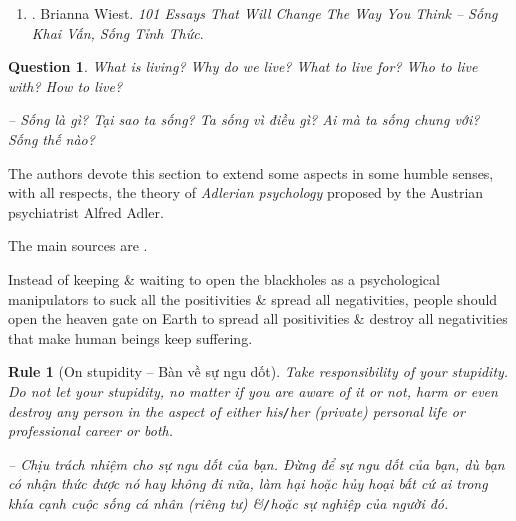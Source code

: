 \documentclass[12pt]{article}
\newtheorem{question}{Question}
\newtheorem{Rule}{Rule}
\begin{document}
\begin{enumerate}
\begin{quotation}
		-- Hoàn thành các mục tiêu không phải là thành công. Mà việc bạn mở rộng bao nhiêu trong quá trình này mới là thành công.
		
		{\it``Your habits create your mood, \& your mood is a filter through which you experience your life.''}
		
		-- Thói quen của bạn tạo ra tâm trạng của bạn, \& tâm trạng của bạn là một bộ lọc để bạn trải nghiệm cuộc sống của mình.
		
		{\it``You must learn to let your conscious decisions dictate your day -- not your fears or impulses.''}
		
		-- Bạn phải học cách để những quyết định có ý thức quyết định ngày của bạn -- chứ không phải nỗi sợ hãi hay sự bốc đồng của bạn
	\end{quotation}	
	Với bản dịch tiếng Việt:
	\item \cite{Wiest_101_essays_VN}. {\sc Brianna Wiest}. {\it 101 Essays That Will Change The Way You Think -- Sống Khai Vấn, Sống Tỉnh Thức}.
\end{enumerate}

\begin{question}
	What is living? Why do we live? What to live for? Who to live with? How to live?
	
	-- Sống là gì? Tại sao ta sống? Ta sống vì điều gì? Ai mà ta sống chung với? Sống thế nào?
\end{question}
The authors devote this section to extend some aspects in some humble senses, with all respects, the theory of {\it Adlerian psychology} proposed by the Austrian psychiatrist {\sc Alfred Adler}.

The main sources are \cite{Adler_science_living}.

Instead of keeping \& waiting to open the blackholes as a psychological manipulators to suck all the positivities \& spread all negativities, people should open the heaven gate on Earth to spread all positivities \& destroy all negativities that make human beings keep suffering.

\begin{Rule}[On stupidity -- Bàn về sự ngu dốt]
	Take responsibility of your stupidity. Do not let your stupidity, no matter if you are aware of it or not, harm or even destroy any person in the aspect of either his{\tt/}her (private) personal life or professional career or both.
	
	-- Chịu trách nhiệm cho sự ngu dốt của bạn. Đừng để sự ngu dốt của bạn, dù bạn có nhận thức được nó hay không đi nữa, làm hại hoặc hủy hoại bất cứ ai trong khía cạnh cuộc sống cá nhân (riêng tư) \&{\tt/}hoặc sự nghiệp của người đó.
\end{Rule}
\end{document}
